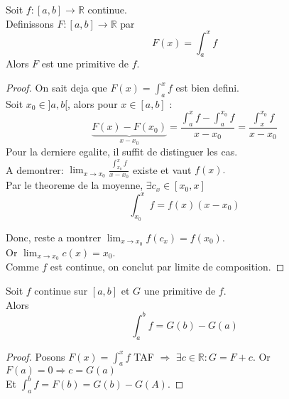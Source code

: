 \documentclass[../main.tex]{subfiles}
\begin{document}
\begin{thm}
	Soit $f:[a,b] \to \mathbb{R}$ continue.\\
	Definissons $F:[a,b] \to \mathbb{R}$ par
	\[ 
		F( x) = \int_{ a }^{ x }f
	\]
	Alors $F$ est une primitive de $f$.

\end{thm}
\begin{proof}
	On sait deja que $F( x) = \int_{ a }^{ x }f$ est bien defini.\\
	Soit $x_0\in]a,b[$, alors pour $x\in [ a,b] $ :
	\[ 
		\underbrace{F( x) -F( x_0) }_{x-x_0} = \frac{\int_{ a }^{ x }f - \int_{ a }^{ x_0 }f}{x-x_0}= \frac{\int_{ x }^{ x_0 }f}{x-x_0}
	\]
	Pour la derniere egalite, il suffit de distinguer les cas.\\
	A demontrer: $\lim_{x \to x_0} \frac{\int_{ x_0 }^{ x }f}{x-x_0}$ existe et vaut $f( x).$\\
	Par le theoreme de la moyenne, $\exists c_x \in [ x_0,x ] $ 
	\[ 
		\int_{ x_0 }^{ x }f = f(x) ( x-x_0) 
	\]
	
	Donc, reste a montrer $\lim_{x \to x_0} f( c_x) = f( x_0) $.\\
	Or $\lim_{x \to x_0} c( x) = x_0$.\\
	Comme $f$ est continue, on conclut par limite de composition.
	
\end{proof}
\begin{thm}	
	Soit $f$ continue sur $[a,b]$ et $G$ une primitive de $f$.\\
	Alors 
	\[ 
		\int_{ a }^{ b }f= G( b) - G( a) 
	\]
	
\end{thm}
\begin{proof}
	Posons $F( x) = \int_{ a }^{ x }f$ TAF $\Rightarrow$ $\exists c \in \mathbb{R}: G = F+c$. Or $F( a) = 0 \Rightarrow  c= G( a) $ \\
	Et $ \int_{ a }^{ b }f= F( b) = G( b) - G( A) $.
\end{proof}
\end{document}
